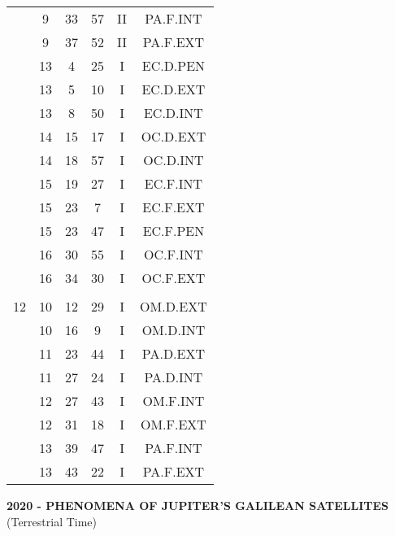 \documentclass[12pt, a4paper]{article}
\begin{document}
\begin{multicols}{3}
{\begin{tabular}{c c c c c c}
	 	 	 	 & 9 & 33 & 57 & II & PA.F.INT\\%
	 	 	 	 & 9 & 37 & 52 & II & PA.F.EXT\\%
	 	 	 	 & 13 & 4 & 25 & I & EC.D.PEN\\%
	 	 	 	 & 13 & 5 & 10 & I & EC.D.EXT\\%
	 	 	 	 & 13 & 8 & 50 & I & EC.D.INT\\%
	 	 	 	 & 14 & 15 & 17 & I & OC.D.EXT\\%
	 	 	 	 & 14 & 18 & 57 & I & OC.D.INT\\%
	 	 	 	 & 15 & 19 & 27 & I & EC.F.INT\\%
	 	 	 	 & 15 & 23 & 7 & I & EC.F.EXT\\%
	 	 	 	 & 15 & 23 & 47 & I & EC.F.PEN\\%
	 	 	 	 & 16 & 30 & 55 & I & OC.F.INT\\%
	 	 	 	 & 16 & 34 & 30 & I & OC.F.EXT\\%
	 	 	 	 & & & & & \\%
	 	 	 	12 & 10 & 12 & 29 & I & OM.D.EXT\\%
	 	 	 	 & 10 & 16 & 9 & I & OM.D.INT\\%
	 	 	 	 & 11 & 23 & 44 & I & PA.D.EXT\\%
	 	 	 	 & 11 & 27 & 24 & I & PA.D.INT\\%
	 	 	 	 & 12 & 27 & 43 & I & OM.F.INT\\%
	 	 	 	 & 12 & 31 & 18 & I & OM.F.EXT\\%
	 	 	 	 & 13 & 39 & 47 & I & PA.F.INT\\%
	 	 	 	 & 13 & 43 & 22 & I & PA.F.EXT\\%
	 	 \end{tabular}
 	}
\end{multicols}
\pagebreak
\textbf{2020 - PHENOMENA OF JUPITER'S GALILEAN SATELLITES}\\(Terrestrial Time) 
\end{document}
